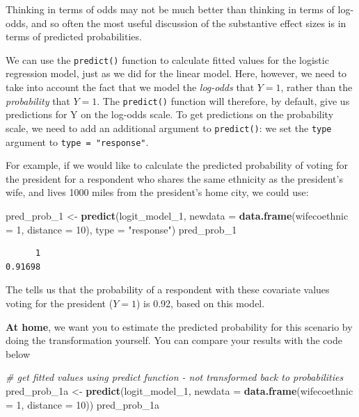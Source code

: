 \documentclass[]{article}
\newenvironment{Shaded}{\begin{snugshade}}{\end{snugshade}}
\newcommand{\KeywordTok}[1]{\textcolor[rgb]{0.13,0.29,0.53}{\textbf{#1}}}
\newcommand{\DataTypeTok}[1]{\textcolor[rgb]{0.13,0.29,0.53}{#1}}
\newcommand{\DecValTok}[1]{\textcolor[rgb]{0.00,0.00,0.81}{#1}}
\newcommand{\StringTok}[1]{\textcolor[rgb]{0.31,0.60,0.02}{#1}}
\newcommand{\CommentTok}[1]{\textcolor[rgb]{0.56,0.35,0.01}{\textit{#1}}}
\newcommand{\NormalTok}[1]{#1}
\theoremstyle{definition}
\theoremstyle{definition}
\theoremstyle{definition}
\theoremstyle{remark}
\begin{document}
Thinking in terms of odds may not be much better than thinking in terms
of log-odds, and so often the most useful discussion of the substantive
effect sizes is in terms of predicted probabilities.

We can use the \texttt{predict()} function to calculate fitted values
for the logistic regression model, just as we did for the linear model.
Here, however, we need to take into account the fact that we model the
\emph{log-odds} that \(Y = 1\), rather than the \emph{probability} that
\(Y=1\). The \texttt{predict()} function will therefore, by default,
give us predictions for Y on the log-odds scale. To get predictions on
the probability scale, we need to add an additional argument to
\texttt{predict()}: we set the \texttt{type} argument to
\texttt{type\ =\ "response"}.

For example, if we would like to calculate the predicted probability of
voting for the president for a respondent who shares the same ethnicity
as the president's wife, and lives 1000 miles from the president's home
city, we could use:

\begin{Shaded}
\begin{Highlighting}[]
\NormalTok{pred_prob_}\DecValTok{1}\NormalTok{ <-}\StringTok{ }\KeywordTok{predict}\NormalTok{(logit_model_}\DecValTok{1}\NormalTok{, }\DataTypeTok{newdata =} \KeywordTok{data.frame}\NormalTok{(}\DataTypeTok{wifecoethnic =} \DecValTok{1}\NormalTok{, }\DataTypeTok{distance =} \DecValTok{10}\NormalTok{), }\DataTypeTok{type =} \StringTok{"response"}\NormalTok{)}
\NormalTok{pred_prob_}\DecValTok{1}
\end{Highlighting}
\end{Shaded}

\begin{verbatim}
      1 
0.91698 
\end{verbatim}

The tells us that the probability of a respondent with these covariate
values voting for the president (\(Y=1\)) is 0.92, based on this model.

\textbf{At home}, we want you to estimate the predicted probability for
this scenario by doing the transformation yourself. You can compare your
results with the code below

\begin{Shaded}
\begin{Highlighting}[]
\CommentTok{# get fitted values using predict function - not transformed back to probabilities}
\NormalTok{pred_prob_1a <-}\StringTok{ }\KeywordTok{predict}\NormalTok{(logit_model_}\DecValTok{1}\NormalTok{, }\DataTypeTok{newdata =} \KeywordTok{data.frame}\NormalTok{(}\DataTypeTok{wifecoethnic =} \DecValTok{1}\NormalTok{, }\DataTypeTok{distance =} \DecValTok{10}\NormalTok{))}
\NormalTok{pred_prob_1a}
\end{Highlighting}
\end{Shaded}
\end{document}
